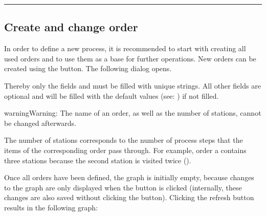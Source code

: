 \documentclass[letterpaper,10pt,english]{sphinxmanual}
\begin{document}


\bigskip\hrule\bigskip



\subsection{Create and change order}
\label{\detokenize{source/Defining_processes/defining_processes:create-and-change-order}}\label{\detokenize{source/Defining_processes/defining_processes:dp-order}}
\sphinxAtStartPar
In order to define a new process, it is recommended to start with creating all used orders and to use them as a base for
further operations. New orders can be created using the  button. The following dialog opens.


\sphinxAtStartPar
Thereby only the fields  and  must be filled with unique strings. All other fields are
optional and will be filled with the default values (see: {\hyperref[\detokenize{source/Interface_files/data_file:data-file}]{}}) if not filled.

\begin{sphinxadmonition}{warning}{Warning:}
\sphinxAtStartPar
The name of an order, as well as the number of stations, cannot be changed afterwards.
\end{sphinxadmonition}

\sphinxAtStartPar
The number of stations corresponds to the number of process steps that the items of the corresponding order pass
through. For example, order a contains three stations because the second station is visited twice ({\hyperref[\detokenize{source/Defining_processes/defining_processes:first}]{}}).

\sphinxAtStartPar
Once all orders have been defined, the graph is initially empty, because changes to the graph are only displayed when
the  button is clicked (internally, these changes are also saved without clicking the button). Clicking
the refresh button results in the following graph:
\end{document}
